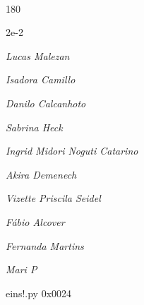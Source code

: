 \documentclass[12pt]{article}
\begin{document}

\pagebreak			

	\ 
	\vfill
	\begin{turn}{180}	
		\begin{minipage}{\textwidth}
		  	\ttfamily %
			\centering
			{\Huge 2e-2}
		  
			\hfill
		  
			

\textit{\small Lucas Malezan}

\textit{\small Isadora Camillo}

\textit{\small Danilo Calcanhoto}

\textit{\small Sabrina Heck}

\textit{\small Ingrid Midori Noguti Catarino}

\textit{\small Akira Demenech}

\textit{\small Vizette Priscila Seidel}

\textit{\small Fábio Alcover}

\textit{\small Fernanda Martins}

\textit{\small Mari P}

\bigskip

eins!.py
0x0024


		\end{minipage}	
	\end{turn}
	\vfill
	\

\pagebreak
\end{document}

